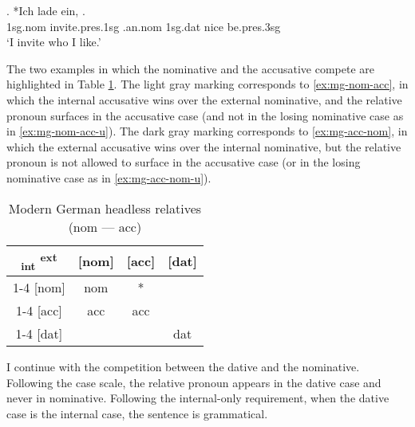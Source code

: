 \exg. *Ich {lade ein},    .\\
1\ac{sg}.\ac{nom} invite.\ac{pres}.1\ac{sg}\scsub{[acc]} .\ac{an}.\ac{nom} 1\ac{sg}.\ac{dat} nice be.\ac{pres}.3\ac{sg}\scsub{[nom]}\\
`I invite who I like.' \label{ex:mg-acc-nom-u}

The two examples in which the nominative and the accusative compete are highlighted in Table \ref{tbl:case-competition-mg-nom-acc}.
The light gray marking corresponds to \ref{ex:mg-nom-acc}, in which the internal accusative wins over the external nominative, and the relative pronoun surfaces in the accusative case (and not in the losing nominative case as in \ref{ex:mg-nom-acc-u}).
The dark gray marking corresponds to \ref{ex:mg-acc-nom}, in which the external accusative wins over the internal nominative, but the relative pronoun is not allowed to surface in the accusative case (or in the losing nominative case as in \ref{ex:mg-acc-nom-u}).

 \begin{table}[ht]
   \center
   \caption{Modern German headless relatives (\ac{nom} --- \ac{acc})}
   \begin{tabular}{c|c|c|c}
     \toprule
     \textsubscript{\ac{int}} \textsuperscript{\ac{ext}}
            & [\ac{nom}]
            & [\ac{acc}]
            & [\ac{dat}]
            \\ \cmidrule{1-4}
        [\ac{nom}]
            & \ac{nom}
            & \cellcolor{DG}*
            &
            \\ \cmidrule{1-4}
        [\ac{acc}]
            & \cellcolor{LG}\ac{acc}
            & \ac{acc}
            &
            \\ \cmidrule{1-4}
        [\ac{dat}]
            &
            &
            & \ac{dat}
            \\
      \bottomrule
   \end{tabular}
     \label{tbl:case-competition-mg-nom-acc}
 \end{table}

I continue with the competition between the dative and the nominative. Following the case scale, the relative pronoun appears in the dative case and never in nominative. Following the internal-only requirement, when the dative case is the internal case, the sentence is grammatical.

